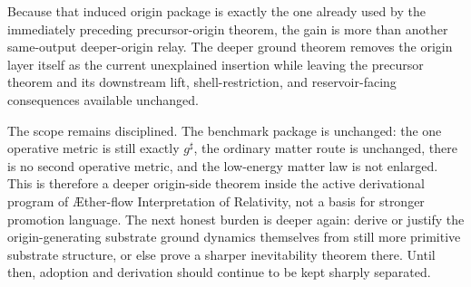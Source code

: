 \documentclass[11pt]{article}
\newcommand{\Aflow}{\AE{}ther-flow}
\newcommand{\TheoryName}{\Aflow{} Interpretation of Relativity}
\newcommand{\CompletedMetric}{g^{\sharp}}
\begin{document}
Because that induced origin package is exactly the one already used by the immediately preceding precursor-origin theorem, the gain is more than another same-output deeper-origin relay. The deeper ground theorem removes the origin layer itself as the current unexplained insertion while leaving the precursor theorem and its downstream lift, shell-restriction, and reservoir-facing consequences available unchanged.

The scope remains disciplined. The benchmark package is unchanged: the one operative metric is still exactly \(\CompletedMetric\), the ordinary matter route is unchanged, there is no second operative metric, and the low-energy matter law is not enlarged. This is therefore a deeper origin-side theorem inside the active derivational program of \TheoryName{}, not a basis for stronger promotion language. The next honest burden is deeper again: derive or justify the origin-generating substrate ground dynamics themselves from still more primitive substrate structure, or else prove a sharper inevitability theorem there. Until then, adoption and derivation should continue to be kept sharply separated.
\end{document}
